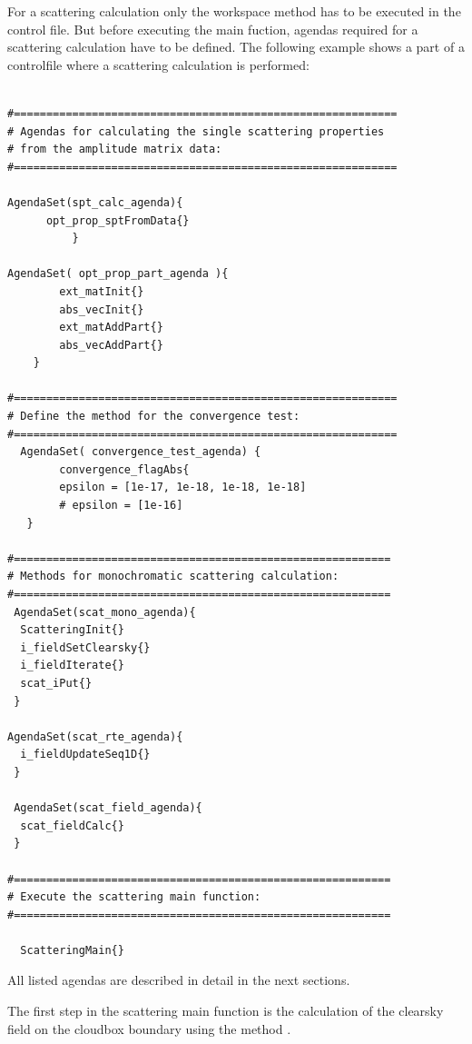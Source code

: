 \label{sec:scattering:main_function}
For a scattering calculation only the workspace method
 has to be executed in the control file.  But
before executing the main fuction, agendas required for a scattering
calculation have to be defined.  The following example shows a part of
a controlfile where a scattering calculation is performed:
\begin{verbatim}

#===========================================================
# Agendas for calculating the single scattering properties
# from the amplitude matrix data:
#===========================================================

AgendaSet(spt_calc_agenda){
      opt_prop_sptFromData{}
          }
 
AgendaSet( opt_prop_part_agenda ){
        ext_matInit{}
        abs_vecInit{}
        ext_matAddPart{}
        abs_vecAddPart{}
    }
 
#===========================================================
# Define the method for the convergence test:
#===========================================================
  AgendaSet( convergence_test_agenda) {
        convergence_flagAbs{
        epsilon = [1e-17, 1e-18, 1e-18, 1e-18] 
        # epsilon = [1e-16]
   }
  
#==========================================================
# Methods for monochromatic scattering calculation:
#==========================================================
 AgendaSet(scat_mono_agenda){
  ScatteringInit{}              
  i_fieldSetClearsky{}
  i_fieldIterate{}
  scat_iPut{}
 }
 
AgendaSet(scat_rte_agenda){
  i_fieldUpdateSeq1D{}
 }
        
 AgendaSet(scat_field_agenda){
  scat_fieldCalc{}
 }      
               
#==========================================================
# Execute the scattering main function:
#==========================================================       
        
  ScatteringMain{}

\end{verbatim}


All listed agendas are described in detail in the next sections.\\
\vspace*{1ex}

The first step in the scattering main function is the calculation of
the clearsky field on the cloudbox boundary using the method
.


